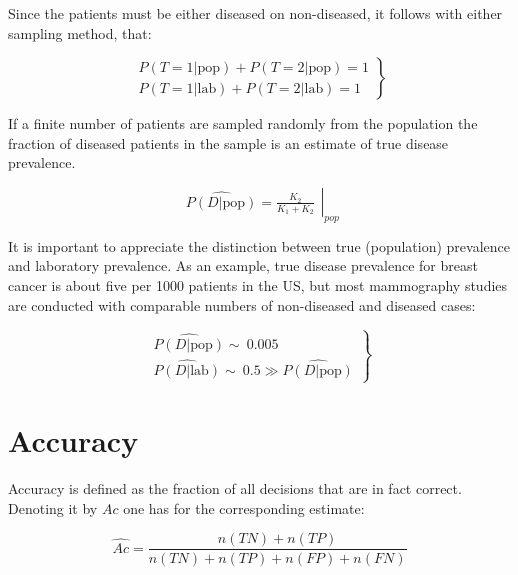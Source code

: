 \documentclass[
]{book}
\begin{document}
Since the patients must be either diseased on non-diseased, it follows with either sampling method, that:

\begin{equation} 
\left.\begin{matrix}
P(T=1|\text{pop})+P(T=2|\text{pop})=1\\
P(T=1|\text{lab})+P(T=2|\text{lab})=1
\end{matrix}\right\}
\label{eq:binaryTask0DisPrevSums}
\end{equation}

If a finite number of patients are sampled randomly from the population the fraction of diseased patients in the sample is an estimate of true disease prevalence.

\begin{equation} 
\left.\begin{matrix}
\widehat{P(D|\text{pop})}=
\frac{K_2}{K_1+K_2}
\end{matrix}\right|_{pop}
\label{eq:binaryTask0DisPrevEst}
\end{equation}

It is important to appreciate the distinction between true (population) prevalence and laboratory prevalence. As an example, true disease prevalence for breast cancer is about five per 1000 patients in the US, but most mammography studies are conducted with comparable numbers of non-diseased and diseased cases:

\begin{equation} 
\left.\begin{matrix}
\widehat{P(D|\text{pop})}\sim ~0.005
\\ 
\widehat{P(D|\text{lab})}\sim ~0.5\gg \widehat{P(D|\text{pop})}
\end{matrix}\right\}
\label{eq:binaryTask0DisPrevLabVsPop}
\end{equation}

\hypertarget{accuracy}{%
\section{Accuracy}\label{accuracy}}

Accuracy is defined as the fraction of all decisions that are in fact correct. Denoting it by \(Ac\) one has for the corresponding estimate:

\begin{equation} 
\widehat{Ac}=\frac{n(TN)+n(TP)}{n(TN)+n(TP)+n(FP)+n(FN)}
\label{eq:binaryTask0AccuracyEst}
\end{equation}
\end{document}
